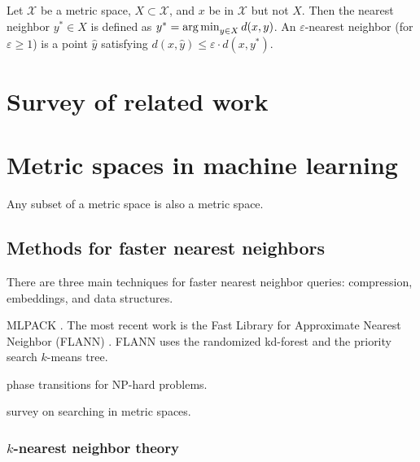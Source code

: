 \documentclass[../main.tex]{subfiles}
\newcommand{\set}[1]{\mathcal {#1}}
\newcommand{\dist}[2]{\distf({#1},{#2})}
\newcommand{\distf}{d}
\begin{document}
\begin{definition}
    Let $\set X$ be a metric space, $X\subset\set X$, and $x$ be in $\set X$ but not $X$.
    Then the nearest neighbor $y^*\in X$ is defined as $y^*=\argmin_{y\in X} \dist{x}{y}$.
    An $\varepsilon$-nearest neighbor (for $\varepsilon\ge1$) is a point $\hat y$ satisfying $\dist{x}{\hat y} \le \varepsilon \cdot\dist{x}{y^*}$.
\end{definition}
\newcommand{\eann}{(1+\varepsilon)\text{-ann}}


\section{Survey of related work}


\section{Metric spaces in machine learning}

\begin{example}
    Any subset of a metric space is also a metric space.
\end{example}

\subsection{Methods for faster nearest neighbors}

There are three main techniques for faster nearest neighbor queries:
compression,
embeddings,
and data structures.


MLPACK \cite{curtin2013mlpack}.
The most recent work is the Fast Library for Approximate Nearest Neighbor (FLANN) \cite{muja2014scalable}.
FLANN uses the randomized kd-forest and the priority search $k$-means tree.

\cite{cheeseman1991really} phase transitions for NP-hard problems.

\cite{chavez2001searching} survey on searching in metric spaces.


\subsubsection{$k$-nearest neighbor theory}
\end{document}

